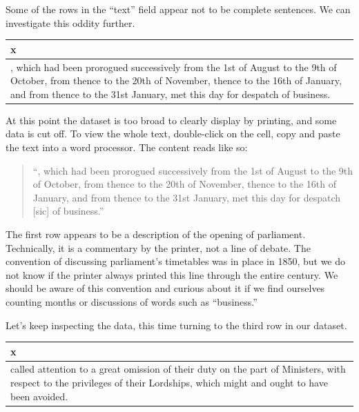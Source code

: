 \documentclass[
]{article}
\begin{document}
Some of the rows in the ``text'' field appear not to be complete
sentences. We can investigate this oddity further.

\begin{longtable}[]{@{}
  >{\raggedright\arraybackslash}p{}@{}}
\toprule\noalign{}
\begin{minipage}[b]{\linewidth}\raggedright
x
\end{minipage} \\
\midrule\noalign{}
\endhead
\bottomrule\noalign{}
\endlastfoot
, which had been prorogued successively from the 1st of August to the
9th of October, from thence to the 20th of November, thence to the 16th
of January, and from thence to the 31st January, met this day for
despatch of business. \\
\end{longtable}

At this point the dataset is too broad to clearly display by printing,
and some data is cut off. To view the whole text, double-click on the
cell, copy and paste the text into a word processor. The content reads
like so:

\begin{quote}
``, which had been prorogued successively from the 1st of August to the
9th of October, from thence to the 20th of November, thence to the 16th
of January, and from thence to the 31st January, met this day for
despatch {[}sic{]} of business.''
\end{quote}

The first row appears to be a description of the opening of parliament.
Technically, it is a commentary by the printer, not a line of debate.
The convention of discussing parliament's timetables was in place in
1850, but we do not know if the printer always printed this line through
the entire century. We should be aware of this convention and curious
about it if we find ourselves counting months or discussions of words
such as ``business.''

Let's keep inspecting the data, this time turning to the third row in
our dataset.

\begin{longtable}[]{@{}
  >{\raggedright\arraybackslash}p{}@{}}
\toprule\noalign{}
\begin{minipage}[b]{\linewidth}\raggedright
x
\end{minipage} \\
\midrule\noalign{}
\endhead
\bottomrule\noalign{}
\endlastfoot
called attention to a great omission of their duty on the part of
Ministers, with respect to the privileges of their Lordships, which
might and ought to have been avoided. \\
\end{longtable}
\end{document}
